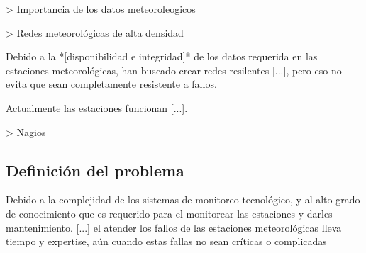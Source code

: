 > Importancia de los datos meteoroleogicos

> Redes meteorológicas de alta densidad



Debido a la *[disponibilidad e integridad]* de los datos requerida en las estaciones meteorológicas, han buscado crear redes resilentes [...], pero eso no evita que sean completamente resistente a fallos.

Actualmente las estaciones funcionan [...].

> Nagios

\subsection{Definición del problema}

Debido a la complejidad de los sistemas de monitoreo tecnológico, y al alto grado de conocimiento que es requerido para el monitorear las estaciones y darles mantenimiento. [...] el atender los fallos de las estaciones meteorológicas lleva tiempo y expertise, aún cuando estas fallas no sean críticas o complicadas
